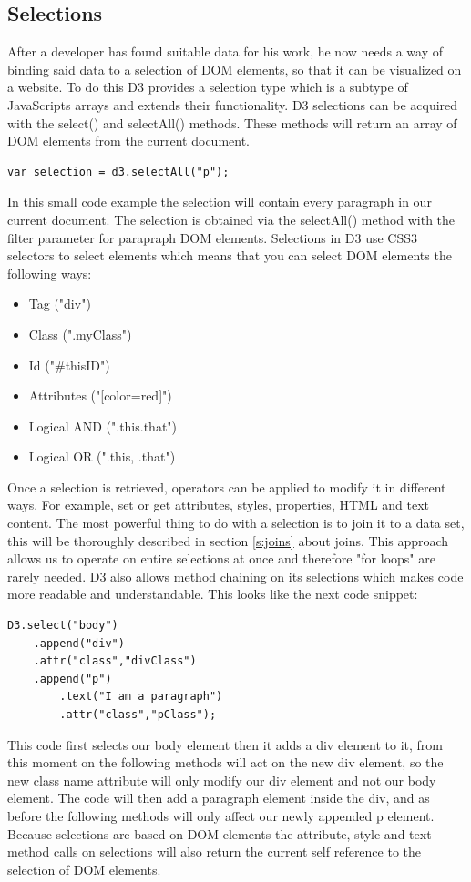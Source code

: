 \documentclass{bioinfo}
\begin{document}
\subsection{Selections}
After a developer has found suitable data for his work, he now needs a way of binding said data to a selection of DOM elements, so that it can be visualized on a website. 
To do this D3 provides a selection type which is a subtype of JavaScripts arrays and extends their functionality. 
D3 selections can be acquired with the select() and selectAll() methods. These methods will return an array of DOM elements from the current document.
\begin{lstlisting}
var selection = d3.selectAll("p");
\end{lstlisting}
In this small code example the selection will contain every paragraph in our current document. The selection is obtained via the selectAll() method with the filter parameter for parapraph DOM elements.
Selections in D3 use CSS3 selectors to select elements which means that you can select DOM elements the following ways:
\begin{itemize}
\item Tag ("div")
\item Class (".myClass")
\item Id ("\#thisID")
\item Attributes ("[color=red]")
\item Logical AND (".this.that")
\item Logical OR (".this, .that")
\end{itemize}
Once a selection is retrieved, operators can be applied to modify it in different ways. For example, set or get attributes, styles, properties, HTML and text content. The most powerful thing to do with a selection is to join it to a data set, this will be thoroughly  described in section \ref{s:joins} about joins.
This approach allows us to operate on entire selections at once and therefore "for loops" are rarely needed. D3 also allows method chaining on its selections which makes code more readable and understandable. This looks like the next code snippet:
\begin{lstlisting}
D3.select("body")
	.append("div")
	.attr("class","divClass")
	.append("p")
		.text("I am a paragraph")
		.attr("class","pClass");
\end{lstlisting}
This code first selects our body element then it adds a div element to it, from this moment on the following methods will act on the new div element, so the new class name attribute will only modify our div element and not our body element. The code will then add a paragraph element inside the div, and as before the following methods will only affect our newly appended p element. 
Because selections are based on DOM elements the attribute, style and text method calls on selections will also return the current self reference to the selection of DOM elements.
\end{document}
